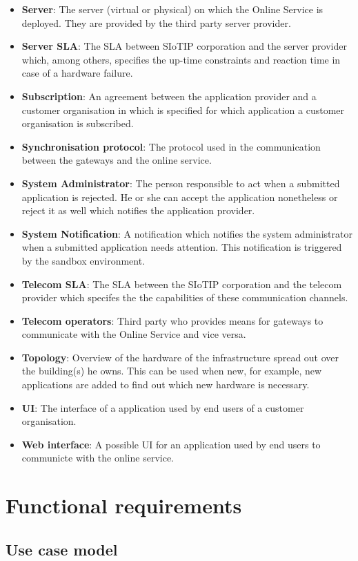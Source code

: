 \documentclass[english]{sareport}
\begin{document}
\begin{itemize}
	\item \textbf{Server}: The server (virtual or physical) on which the Online Service is deployed. They are provided by the third party server provider.
	\item \textbf{Server SLA}: The SLA between SIoTIP corporation and the server provider which, among others, specifies the up-time constraints and reaction time in case of a hardware failure.
	\item \textbf{Subscription}: An agreement between the application provider and a customer organisation in which is specified for which application a customer organisation is subscribed.
	\item \textbf{Synchronisation protocol}: The protocol used in the communication between the gateways and the online service.
	\item \textbf{System Administrator}: The person responsible to act when a submitted application is rejected. He or she can accept the application nonetheless or reject it as well which notifies the application provider.
	\item \textbf{System Notification}: A notification which notifies the system administrator when a submitted application needs attention. This notification is triggered by the sandbox environment.
	\item \textbf{Telecom SLA}: The SLA between the SIoTIP corporation and the telecom provider which specifes the the capabilities of these communication channels.
	\item \textbf{Telecom operators}: Third party who provides means for gateways to communicate with the Online Service and vice versa.
	\item \textbf{Topology}: Overview of the hardware of the infrastructure spread out over the building(s) he owns. This can be used when new, for example, new applications are added to find out which new hardware is necessary.
	\item \textbf{UI}: The interface of a application used by end users of a customer organisation.
	\item \textbf{Web interface}: A possible UI for an application used by end users to communicte with the online service.
\end{itemize}

\chapter{Functional requirements}\label{sec:functional}
\section*{Use case model}
\end{document}
